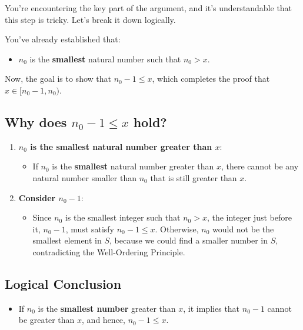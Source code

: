 \documentclass{article}
\begin{document}
You're encountering the key part of the argument, and it's understandable that this step is tricky. Let’s break it down logically.

You’ve already established that:

\begin{itemize}
    \item \( n_0 \) is the \textbf{smallest} natural number such that \( n_0 > x \).
\end{itemize}

Now, the goal is to show that \( n_0 - 1 \leq x \), which completes the proof that \( x \in [n_0 - 1, n_0) \).

\subsection*{Why does \( n_0 - 1 \leq x \) hold?}

\begin{enumerate}
    \item \textbf{\( n_0 \) is the smallest natural number greater than \( x \)}:
    \begin{itemize}
        \item If \( n_0 \) is the \textbf{smallest} natural number greater than \( x \), there cannot be any natural number smaller than \( n_0 \) that is still greater than \( x \).
    \end{itemize}
    
    \item \textbf{Consider \( n_0 - 1 \)}:
    \begin{itemize}
        \item Since \( n_0 \) is the smallest integer such that \( n_0 > x \), the integer just before it, \( n_0 - 1 \), must satisfy \( n_0 - 1 \leq x \). Otherwise, \( n_0 \) would not be the smallest element in \( S \), because we could find a smaller number in \( S \), contradicting the Well-Ordering Principle.
    \end{itemize}
\end{enumerate}

\subsection*{Logical Conclusion}

\begin{itemize}
    \item If \( n_0 \) is the \textbf{smallest number} greater than \( x \), it implies that \( n_0 - 1 \) cannot be greater than \( x \), and hence, \( n_0 - 1 \leq x \).
\end{itemize}
\end{document}
